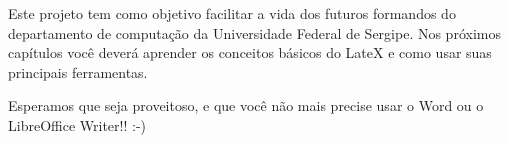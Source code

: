 Este projeto tem como objetivo facilitar a vida dos futuros formandos do departamento de computação da Universidade Federal de Sergipe. Nos próximos capítulos você deverá aprender os conceitos básicos do LateX e como usar suas principais ferramentas.

Esperamos que seja proveitoso, e que você não mais precise usar o Word ou o LibreOffice Writer!! :-)

